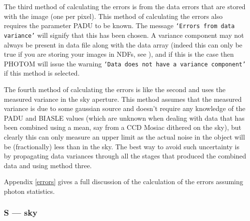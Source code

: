 \documentclass[twoside,11pt,nolof]{starlink}
\providecommand{\st}[1]{\texttt{`#1'}}
\begin{document}
The third method of calculating the errors is from the data errors
that are stored with the image (one per pixel). This method of
calculating the errors also requires the parameter PADU to be
known. The message \st{Errors from data variance} will signify that
this has been chosen. A variance component may not always be present
in data file along with the data array (indeed this can only be true
if you are storing your images in NDFs, see
),
and if this is the case then PHOTOM
will issue the warning \st{Data does not have a variance component} if this
method is selected.

The fourth method of calculating the errors is like the second and uses the
measured variance in the sky aperture. This method assumes that the measured
variance is due to some gaussian source and doesn't require any knowledge of
the PADU and BIASLE values (which are unknown when dealing with data that has
been combined using a mean, say from a CCD Mosiac dithered on the sky), but
clearly this can only measure an upper limit as the actual noise in the
object will be (fractionally) less than in the sky. The best way to avoid
such uncertainty is by propagating data variances through all the stages that
produced the combined data and using method three.

\begin{latexonly}
Appendix \ref{errors} gives a full discussion of the calculation of
the errors assuming photon statistics.
\end{latexonly}



\subsubsection{S --- sky}
\end{document}
